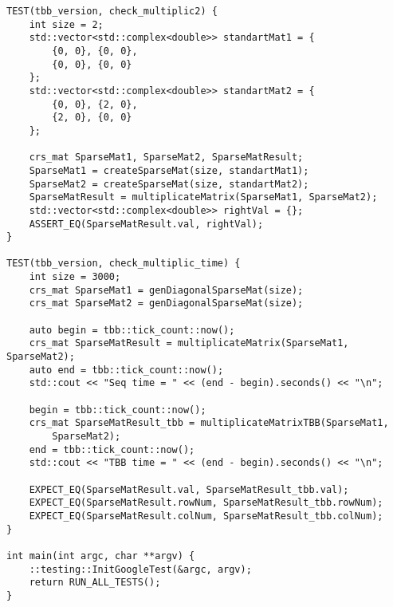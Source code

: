 \documentclass{report}
\begin{document}
\begin{lstlisting}
TEST(tbb_version, check_multiplic2) {
    int size = 2;
    std::vector<std::complex<double>> standartMat1 = {
        {0, 0}, {0, 0},
        {0, 0}, {0, 0}
    };
    std::vector<std::complex<double>> standartMat2 = {
        {0, 0}, {2, 0},
        {2, 0}, {0, 0}
    };

    crs_mat SparseMat1, SparseMat2, SparseMatResult;
    SparseMat1 = createSparseMat(size, standartMat1);
    SparseMat2 = createSparseMat(size, standartMat2);
    SparseMatResult = multiplicateMatrix(SparseMat1, SparseMat2);
    std::vector<std::complex<double>> rightVal = {};
    ASSERT_EQ(SparseMatResult.val, rightVal);
}

TEST(tbb_version, check_multiplic_time) {
    int size = 3000;
    crs_mat SparseMat1 = genDiagonalSparseMat(size);
    crs_mat SparseMat2 = genDiagonalSparseMat(size);

    auto begin = tbb::tick_count::now();
    crs_mat SparseMatResult = multiplicateMatrix(SparseMat1, SparseMat2);
    auto end = tbb::tick_count::now();
    std::cout << "Seq time = " << (end - begin).seconds() << "\n";

    begin = tbb::tick_count::now();
    crs_mat SparseMatResult_tbb = multiplicateMatrixTBB(SparseMat1,
        SparseMat2);
    end = tbb::tick_count::now();
    std::cout << "TBB time = " << (end - begin).seconds() << "\n";

    EXPECT_EQ(SparseMatResult.val, SparseMatResult_tbb.val);
    EXPECT_EQ(SparseMatResult.rowNum, SparseMatResult_tbb.rowNum);
    EXPECT_EQ(SparseMatResult.colNum, SparseMatResult_tbb.colNum);
}

int main(int argc, char **argv) {
    ::testing::InitGoogleTest(&argc, argv);
    return RUN_ALL_TESTS();
}
\end{lstlisting}
\end{document}
